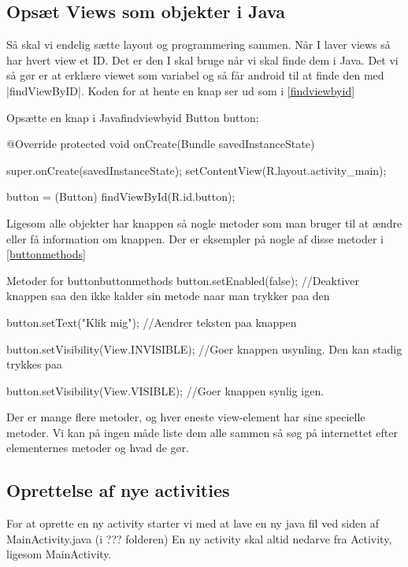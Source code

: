 \subsection{Opsæt Views som objekter i Java}
Så skal vi endelig sætte layout og programmering sammen. Når I laver views så har hvert view et ID. Det er den I skal bruge når vi skal finde dem i Java. Det vi så gør er at erklære viewet som variabel og så får android til at finde den med \JavaInline|findViewByID|. Koden for at hente en knap ser ud som i \autoref{findviewbyid}

\begin{JavaCode}{Opsætte en knap i Java}{findviewbyid}
	Button button;
	
	@Override
	protected void onCreate(Bundle savedInstanceState) {
		super.onCreate(savedInstanceState);
		setContentView(R.layout.activity_main);
		
		button = (Button) findViewById(R.id.button);
	}
\end{JavaCode}

Ligesom alle objekter har knappen så nogle metoder som man bruger til at ændre eller få information om knappen. Der er eksempler på nogle af disse metoder i \autoref{buttonmethods}
\begin{JavaCode}{Metoder for button}{buttonmethods}
	button.setEnabled(false);
	//Deaktiver knappen saa den ikke kalder sin metode naar man trykker paa den
	
	button.setText("Klik mig");
	//Aendrer teksten paa knappen 
	
    button.setVisibility(View.INVISIBLE);
    //Goer knappen usynling. Den kan stadig trykkes paa
    
    button.setVisibility(View.VISIBLE);
    //Goer knappen synlig igen.
	
\end{JavaCode}
Der er mange flere metoder, og hver eneste view-element har sine specielle metoder. Vi kan på ingen måde liste dem alle sammen så søg på internettet efter elementernes metoder og hvad de gør. 


\subsection{Oprettelse af nye activities}

For at oprette en ny activity starter vi med at lave en ny java fil ved siden af MainActivity.java (i ??? folderen) En ny activity skal altid nedarve fra Activity, ligesom MainActivity. 


